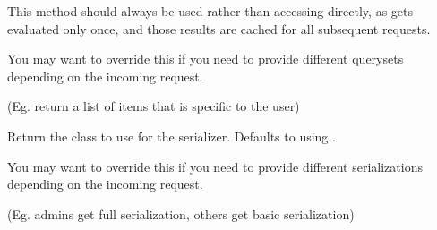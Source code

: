 \documentclass[letterpaper,10pt,english]{sphinxmanual}
\begin{document}
\begin{fulllineitems}
\begin{fulllineitems}
\sphinxAtStartPar
This method should always be used rather than accessing 
directly, as  gets evaluated only once, and those results
are cached for all subsequent requests.

\sphinxAtStartPar
You may want to override this if you need to provide different
querysets depending on the incoming request.

\sphinxAtStartPar
(Eg. return a list of items that is specific to the user)

\end{fulllineitems}


\begin{fulllineitems}
\label{\detokenize{modules/events/views:events.views.MicrocycleViewSet.get_serializer_class}}
\pysigstartsignatures
{}
\pysigstopsignatures
\sphinxAtStartPar
Return the class to use for the serializer.
Defaults to using .

\sphinxAtStartPar
You may want to override this if you need to provide different
serializations depending on the incoming request.

\sphinxAtStartPar
(Eg. admins get full serialization, others get basic serialization)

\end{fulllineitems}


\begin{fulllineitems}
\label{\detokenize{modules/events/views:events.views.MicrocycleViewSet.name}}
\pysigstartsignatures
{}
\pysigstopsignatures
\end{fulllineitems}


\begin{fulllineitems}
\label{\detokenize{modules/events/views:events.views.MicrocycleViewSet.perform_create}}
\pysigstartsignatures
{}
\pysigstopsignatures
\end{fulllineitems}


\end{fulllineitems}
\end{document}
